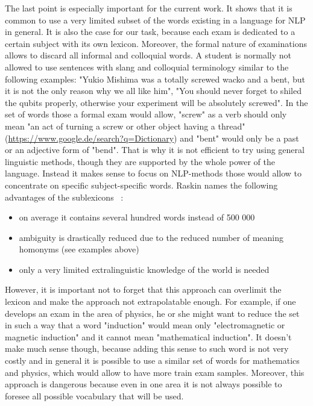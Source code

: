 \documentclass[11pt]{report}
\numberwithin{equation}{section} %
\begin{document}
The last point is especially important for the current work. It shows that it is common to use a very limited subset of the words existing in a language for NLP in general. It is also the case for our task, because each exam is dedicated to a certain subject with its own lexicon. Moreover, the formal nature of examinations allows to discard all informal and colloquial words. A student is normally not allowed to use sentences with slang and colloquial terminology similar to the following examples: "Yukio Mishima was a totally screwed wacko and a bent, but it is not the only reason why we all like him", "You should never forget to shiled the qubits properly, otherwise your experiment will be absolutely screwed". In the set of words those a formal exam would allow, "screw" as a verb should only mean "an act of turning a screw or other object having a thread" (\url{https://www.google.de/search?q=Dictionary}) and "bent" would only be a past or an adjective form of "bend".  That is why it is not efficient to try using general linguistic methods, though they are supported by the whole power of the language. Instead it makes sense to focus on NLP-methods those would allow to concentrate on specific subject-specific words. Raskin names the following advantages of the sublexicons ~\cite{Raskin}:

\begin{itemize}
\item on average it contains several hundred words instead of 500 000  
\item ambiguity is drastically reduced due to the reduced number of meaning homonyms (see examples above)
\item only a very limited extralinguistic knowledge of the world is needed
\end{itemize}

However, it is important not to forget that this approach can overlimit the lexicon and make the approach not extrapolatable enough. For example, if one develops an exam in the area of physics, he or she might want to reduce the set in such a way that a word "induction" would mean only "electromagnetic or magnetic induction" and it cannot mean "mathematical induction". It doesn't make much sense though, because adding this sense to such word is not very costly and in general it is possible to use a similar set of words for mathematics and physics, which would allow to have more train exam samples. Moreover, this approach is dangerous because even in one area it is not always possible to foresee all possible vocabulary that will be used.
\end{document}
